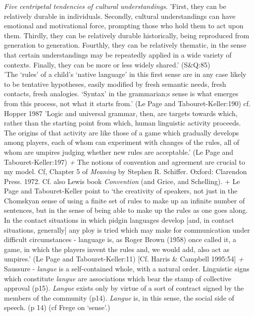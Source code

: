\textit{Five centripetal tendencies of cultural understandings}.
'First, they can be relatively durable in individuals. Secondly, cultural understandings can have emotional and motivational force, prompting those who hold them to act upon them. Thirdly, they can be relatively durable historically, being reproduced from generation to generation. Fourthly, they can be relatively thematic, in the sense that certain understandings may be repeatedly applied in a wide variety of contexts. Finally, they can be more or less widely shared.' (S\&Q:85)
\\
'The \textquoteleft rules' of a child's \textquoteleft native language' in this first sense are in any case likely to be tentative hypotheses, easily modified by fresh semantic needs, fresh contacts, fresh analogies. \textquoteleft Syntax' in the grammarian;s sense is what emerges from this process, not what it starts from.' (Le Page and Tabouret-Keller:190) cf. Hopper 1987
\textit{
}'Logic and universal grammar, then, are targets towards which, rather than the starting point from which, human linguistic activity proceeds. The origins of that activity are like those of a game which gradually develops among players, each of whom can experiment with changes of the rules, all of whom are umpires judging whether new rules are acceptable.' (Le Page and Tabouret-Keller:197)
\textit{+
}The notions of convention and agreement are crucial to my model. Cf, Chapter 5 of \textit{Meaning }by Stephen R. Schiffer. Oxford: Clarendon Press. 1972. Cf. also Lewis book \textit{Convention }(and Grice, and Schelling).
+
Le Page and Tabouret-Keller point to \textquoteleft the creativity of speakers, not just in the Chomskyan sense of using a finite set of rules to make up an infinite number of sentences, but in the sense of being able to make up the rules as one goes along. In the contact situations in which pidgin languages develop [and, in contact situations, generally] any ploy is tried which may make for communication under difficult circumstances - language is, as Roger Brown (1958) once called it, a game, in which the players invent the rules and, we would add, also act as umpires.' (Le Page and Tabouret-Keller:11) [Cf. Harris \& Campbell 1995:54]
\textit{+
}
Saussure - \textit{langue} is a self-contained whole, with a natural order.  Linguistic signs which constitute \textit{langue} are associations which bear the stamp of collective approval (p15).  \textit{Langue }exists only by virtue of a sort of contract signed by the members of the community (p14). \textit{Langue} is, in this sense, the social side of speech. (p 14) (cf Frege on \textquoteleft sense'.)

